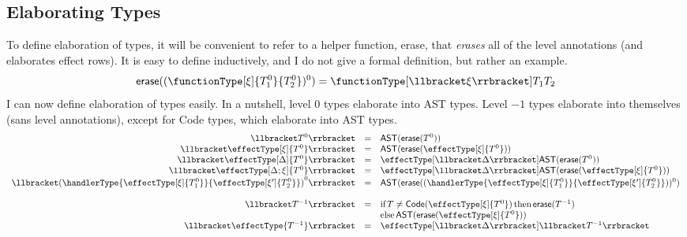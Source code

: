 \subsection{Elaborating Types}
To define elaboration of types, it will be convenient to refer to a helper function, \textsf{erase}, that \textit{erases} all of the level annotations (and elaborates effect rows). It is easy to define inductively, and I do not give a formal definition, but rather an example. 
\[\textsf{erase}((\functionType[\xi]{T_1^0}{T_2^0})^0) = \functionType[\elaborate{\xi}]{T_1}{T_2}\]
I can now define elaboration of types easily. In a nutshell, level $0$ types elaborate into \textsf{AST} types. Level $-1$ types elaborate into themselves (sans level annotations), except for \textsf{Code} types, which elaborate into \textsf{AST} types.
\[
\begin{array}{rcl}
  \elaborate{T^0} & = & \AST{\erase{T^0}}\\
  \elaborate{\effectType[\xi]{T^0}} & = & \AST{\erase{\effectType[\xi]{T^0}}}\\
  \elaborate{\effectType[\Delta]{T^0}} & = & \effectType[\elaborate{\Delta}]{\AST{\erase{T^0}}}\\
  \elaborate{\effectType[\Delta ; \xi]{T^0}} & = & \effectType[\elaborate{\Delta}]{\AST{\erase{\effectType[\xi]{T^0}}}}\\
  \elaborate{{(\handlerType{\effectType[\xi]{T_1^0}}{\effectType[\xi']{T_2^0}})}^0} & = & {\AST{\erase{(\handlerType{\effectType[\xi]{T_1^0}}{\effectType[\xi']{T_2^0}})}^0}}\\\\
  \elaborate{T^{-1}} & = & \text{if} \, T \neq \Code{\effectType[\xi]{T^0}} \, \text{then} \, \erase{T^{-1}} \\ && \text{else}\, \AST{\erase{\effectType[\xi]{T^0}}}\\
  \elaborate{\effectType{T^{-1}}} & = & \effectType[\elaborate{\Delta}]{\elaborate{T^{-1}}}\\
\end{array}
\]
